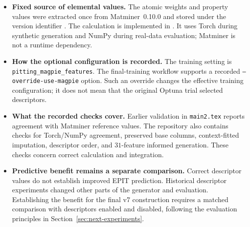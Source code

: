 \documentclass[11pt]{article}
\newenvironment{notes}
  {\begin{itemize}\setlength{\itemsep}{0.45em}\setlength{\parsep}{0pt}}
  {\end{itemize}}
\begin{document}
\begin{notes}
    \item \textbf{Fixed source of elemental values.}
    The atomic weights and property values were extracted
    once from Matminer~0.10.0 and stored under the version
    identifier
    .
    The calculation is implemented in
    .
    It uses Torch during synthetic generation and NumPy
    during real-data evaluation; Matminer is not a runtime
    dependency.

    \item \textbf{How the optional configuration is recorded.}
    The training setting is
    \texttt{pitting\_magpie\_features}.
    The final-training workflow supports a recorded
    \texttt{--override-use-magpie} option.
    Such an override changes the effective training
    configuration; it does not mean that the original
    Optuna trial selected descriptors.

    \item \textbf{What the recorded checks cover.}
    Earlier validation in \texttt{main2.tex} reports
    agreement with Matminer reference values.
    The repository also contains checks for Torch/NumPy
    agreement, preserved base columns, context-fitted
    imputation, descriptor order, and \(31\)-feature
    informed generation.
    These checks concern correct calculation and integration.

    \item \textbf{Predictive benefit remains a separate comparison.}
    Correct descriptor values do not establish improved
    EPIT prediction. Historical descriptor experiments
    changed other parts of the generator and evaluation.
    Establishing the benefit for the final v7 construction
    requires a matched comparison with descriptors enabled
    and disabled, following the evaluation principles in
    Section~\ref{sec:next-experiments}.
\end{notes}
\end{document}
